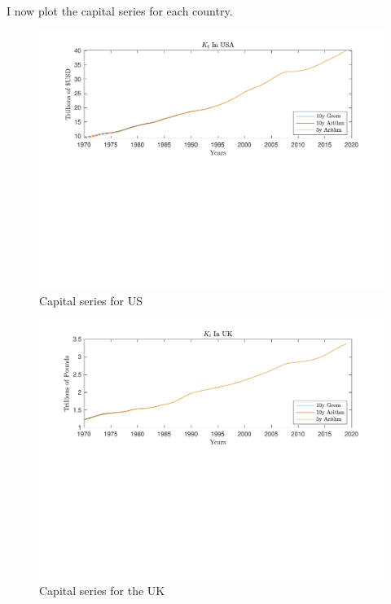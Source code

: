 \documentclass[12pt]{article}
\theoremstyle{mytheoremstyle}
\theoremstyle{mytheoremstyle}
\theoremstyle{myproblemstyle}
\begin{document}
I now plot the capital series for each country.

\begin{figure}
    \includegraphics[trim = 0in 3.2in 0in 0in, clip, width=1\textwidth]{out/Capital_Series_US.pdf}
    \caption{Capital series for US}
\end{figure}

\begin{figure}[h]
    \includegraphics[trim = 0in 3.2in 0in 0in, clip, width=1\textwidth]{out/Capital_Series_uk.pdf}
    \caption{Capital series for the UK}
\end{figure}
\end{document}
